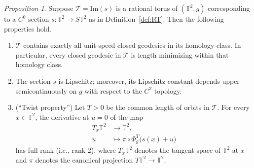 \documentclass[11pt,letterpaper,oneside]{amsart}
\newcommand{\T}{\mathbb{T}}
\newcommand{\im}{\text{Im}}
\theoremstyle{definition}
\theoremstyle{remark}
\newtheorem{proposition}[theorem]{Proposition}
\theoremstyle{definition}
\theoremstyle{remark}
\newcommand{\CT}{\mathcal{T}}
\begin{document}
\begin{proposition}\label{prop:geom RT}
    Suppose $\CT = \im(s)$ is a rational torus of $(\T^2, g)$ corresponding to a $C^0$ section $s: \T^2 \to S\T^2$ as in Definition~\ref{def:RT}.
    Then the following properties hold.
    \begin{enumerate}
        \item $\CT$ contains exactly all unit-speed closed geodesics in its homology class. 
        In particular, every closed geodesic in $\CT$ is length minimizing within that homology class.
        \item The section $s$ is Lipschitz; moreover, its Lipschitz constant depends upper semicontinuously on $g$ with respect to the $C^2$ topology.
        \item (``Twist property'') Let $T > 0$ be the common length of orbits in $\CT$. For every $x \in \T^2$, the derivative at $u=0$ of the map
        \begin{equation}\label{eq:twist}
            \begin{aligned}
                T_x\T^2 &\longrightarrow \T^2,\\
                u &\longmapsto \pi\circ \Phi_g^T\big(s(x)+u\big)
            \end{aligned}
        \end{equation}
        has full rank (i.e., rank $2$), where $T_x \T^2$ denotes the tangent space of $\T^2$ at $x$ and $\pi$ denotes the canonical projection $T\T^2 \to \T^2$.
    \end{enumerate}
\end{proposition}
\end{document}
